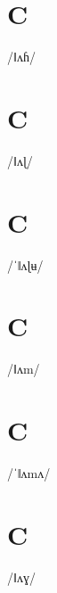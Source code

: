 \documentclass[10pt,a4paper,twoside]{book}
\begin{document}
\section*{C}

\begin{multicols}{3}
 {/ǁʌɦ/} {}
\end{multicols}

\section*{C}

\begin{multicols}{3}
 {/ǁʌɭ/} {}
\end{multicols}

\section*{C}

\begin{multicols}{3}
 {/ˈǁʌɭʉ/} {}
\end{multicols}

\section*{C}

\begin{multicols}{3}
 {/ǁʌm/} {}
\end{multicols}

\section*{C}

\begin{multicols}{3}
 {/ˈǁʌmʌ/} {}
\end{multicols}

\section*{C}

\begin{multicols}{3}
 {/ǁʌɣ/} {}
\end{multicols}
\end{document}
